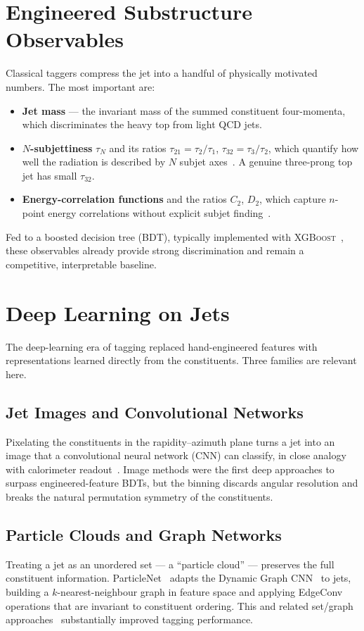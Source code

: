 \section{Engineered Substructure Observables}
\label{sec:observables}

Classical taggers compress the jet into a handful of physically motivated
numbers. The most important are:
\begin{itemize}
    \item \textbf{Jet mass} --- the invariant mass of the summed constituent
    four-momenta, which discriminates the heavy top from light QCD jets.
    \item \textbf{$N$-subjettiness} $\tau_N$ and its ratios
    $\tau_{21}=\tau_2/\tau_1$, $\tau_{32}=\tau_3/\tau_2$, which quantify how
    well the radiation is described by $N$ subjet axes~\citep{thaler2011}. A
    genuine three-prong top jet has small $\tau_{32}$.
    \item \textbf{Energy-correlation functions} and the ratios $C_2$, $D_2$,
    which capture $n$-point energy correlations without explicit subjet
    finding~\citep{larkoski2013,larkoski2014}.
\end{itemize}
Fed to a boosted decision tree (BDT), typically implemented with
\textsc{XGBoost}~\citep{chen2016xgboost}, these observables already provide
strong discrimination and remain a competitive, interpretable baseline.

\section{Deep Learning on Jets}
\label{sec:deep}

The deep-learning era of tagging replaced hand-engineered features with
representations learned directly from the constituents. Three families are
relevant here.

\subsection{Jet Images and Convolutional Networks}
Pixelating the constituents in the rapidity--azimuth plane turns a jet into
an image that a convolutional neural network (CNN) can classify, in close
analogy with calorimeter readout~\citep{deoliveira2016,komiske2017}. Image
methods were the first deep approaches to surpass engineered-feature BDTs,
but the binning discards angular resolution and breaks the natural
permutation symmetry of the constituents.

\subsection{Particle Clouds and Graph Networks}
Treating a jet as an unordered set --- a ``particle cloud'' --- preserves the
full constituent information. ParticleNet~\citep{qu2020particlenet} adapts the
Dynamic Graph CNN~\citep{wang2019dgcnn} to jets, building a
$k$-nearest-neighbour graph in feature space and applying EdgeConv operations
that are invariant to constituent ordering. This and related set/graph
approaches~\citep{komiske2019efn,moreno2020jedinet} substantially improved
tagging performance.

